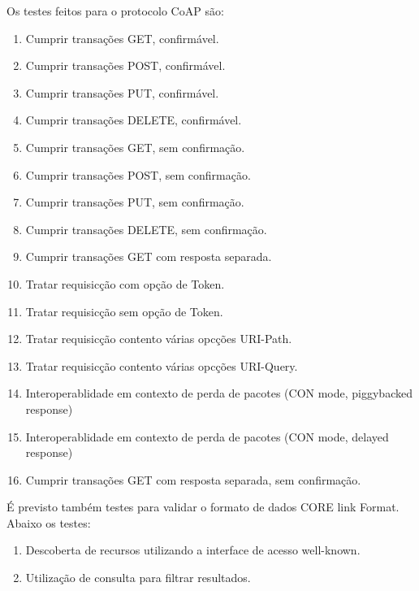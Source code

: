 Os testes feitos para o protocolo CoAP s\~ao:
\begin{enumerate}
    \item Cumprir transa\c{c}\~oes GET, confirm\'avel.
    \item Cumprir transa\c{c}\~oes POST, confirm\'avel.
    \item Cumprir transa\c{c}\~oes PUT, confirm\'avel.
    \item Cumprir transa\c{c}\~oes DELETE, confirm\'avel.
    \item Cumprir transa\c{c}\~oes GET, sem confirma\c{c}\~ao.
    \item Cumprir transa\c{c}\~oes POST, sem confirma\c{c}\~ao.
    \item Cumprir transa\c{c}\~oes PUT, sem confirma\c{c}\~ao.
    \item Cumprir transa\c{c}\~oes DELETE, sem confirma\c{c}\~ao. 
    \item Cumprir transa\c{c}\~oes GET com resposta separada.
    \item Tratar requisic\c{c}\~ao com op\c{c}\~ao de Token.
    \item Tratar requisic\c{c}\~ao sem op\c{c}\~ao de Token.
    \item Tratar requisic\c{c}\~ao contento v\'arias opc\c{c}\~oes URI-Path.
    \item Tratar requisic\c{c}\~ao contento v\'arias opc\c{c}\~oes URI-Query.
    \item Interoperablidade em contexto de perda de pacotes (CON mode, piggybacked response)
    \item Interoperablidade em contexto de perda de pacotes (CON mode, delayed response)
    \item Cumprir transa\c{c}\~oes GET com resposta separada, sem confirma\c{c}\~ao.
\end{enumerate}

\'E previsto tamb\'em testes para validar o formato de dados CORE link Format. Abaixo os testes:

\begin{enumerate}
    \item Descoberta de recursos utilizando a interface de acesso well-known.
    \item Utiliza\c{c}\~ao de consulta para filtrar resultados.
\end{enumerate}

